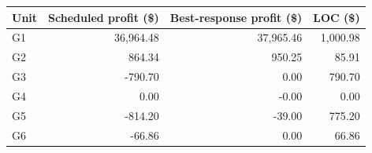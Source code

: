 \begin{tabular}{lrrr}
\toprule
Unit & Scheduled profit (\$) & Best-response profit (\$) & LOC (\$) \\
\midrule
G1 & 36,964.48 & 37,965.46 & 1,000.98 \\
G2 & 864.34 & 950.25 & 85.91 \\
G3 & -790.70 & 0.00 & 790.70 \\
G4 & 0.00 & -0.00 & 0.00 \\
G5 & -814.20 & -39.00 & 775.20 \\
G6 & -66.86 & 0.00 & 66.86 \\
\bottomrule
\end{tabular}
